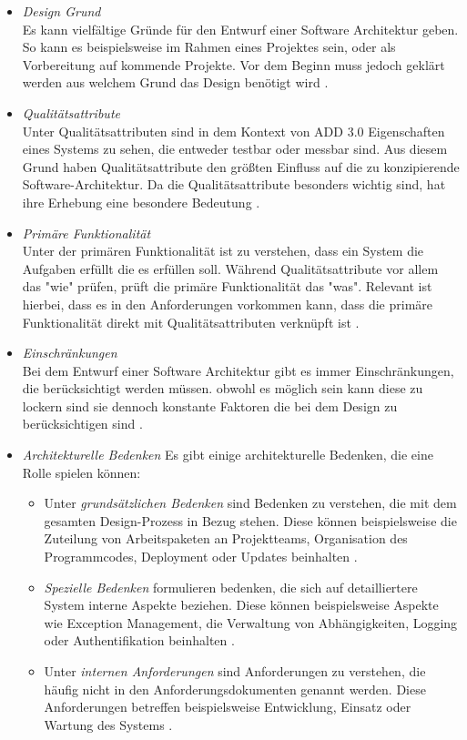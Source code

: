 \begin{itemize}
\item \emph{Design Grund} \\
Es kann vielfältige Gründe für den Entwurf einer Software Architektur geben. So kann es beispielsweise im Rahmen eines Projektes sein, oder als Vorbereitung auf kommende Projekte. Vor dem Beginn muss jedoch geklärt werden aus welchem Grund das Design benötigt wird \cite{Cer01}.
\item \emph{Qualitätsattribute} \\
Unter Qualitätsattributen sind in dem Kontext von ADD 3.0 Eigenschaften eines Systems zu sehen, die entweder testbar oder messbar sind. Aus diesem Grund haben Qualitätsattribute den größten Einfluss auf die zu konzipierende Software-Architektur. Da die Qualitätsattribute besonders wichtig sind, hat ihre Erhebung eine besondere Bedeutung \cite{Cer01}.
\item \emph{Primäre Funktionalität} \\
Unter der primären Funktionalität ist zu verstehen, dass ein System die Aufgaben erfüllt die es erfüllen soll. Während Qualitätsattribute vor allem das "wie" prüfen, prüft die primäre Funktionalität das "was". Relevant ist hierbei, dass es in den Anforderungen vorkommen kann, dass die primäre Funktionalität direkt mit Qualitätsattributen verknüpft ist \cite{Cer01}. 
\item \emph{Einschränkungen} \\
Bei dem Entwurf einer Software Architektur gibt es immer Einschränkungen, die berücksichtigt werden müssen. obwohl es möglich sein kann diese zu lockern sind sie dennoch konstante Faktoren die bei dem Design zu berücksichtigen sind \cite{Cer01}.
\item \emph{Architekturelle Bedenken} Es gibt einige architekturelle Bedenken, die eine Rolle spielen können:
\begin{itemize}
\item Unter \emph{grundsätzlichen Bedenken} sind Bedenken zu verstehen, die mit dem gesamten Design-Prozess in Bezug stehen. Diese können beispielsweise die Zuteilung von Arbeitspaketen an Projektteams, Organisation des Programmcodes, Deployment oder Updates beinhalten \cite{Cer01}.
\item \emph{Spezielle Bedenken} formulieren bedenken, die sich auf detailliertere System interne Aspekte beziehen. Diese können beispielsweise Aspekte wie Exception Management, die Verwaltung von Abhängigkeiten, Logging oder Authentifikation beinhalten \cite{Cer01}.
\item Unter \emph{internen Anforderungen} sind Anforderungen zu verstehen, die häufig nicht in den Anforderungsdokumenten genannt werden. Diese Anforderungen betreffen beispielsweise Entwicklung, Einsatz oder Wartung des Systems \cite{Cer01}.  

\end{itemize}
\end{itemize}
